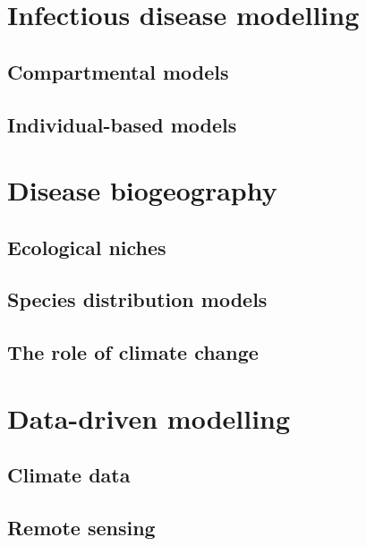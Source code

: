 
\section{\label{sec:Infectious disease modelling} Infectious
  disease modelling}

\subsection{\label{sec:Compartmental models} Compartmental models}

\subsection{\label{sec:Individual-based models} Individual-based models}

\section{\label{sec:Disease biogeography} Disease biogeography}

\subsection{\label{sec:Ecological niches} Ecological niches}


\subsection{\label{sec:Species distribution models} Species distribution
  models}

\subsection{\label{sec:The role of climate change} The role of climate change}

\section{\label{sec:Data-driven modelling} Data-driven modelling}

\subsection{\label{sec:Climate data} Climate data}

\subsection{\label{sec:Remote sensing} Remote sensing}

